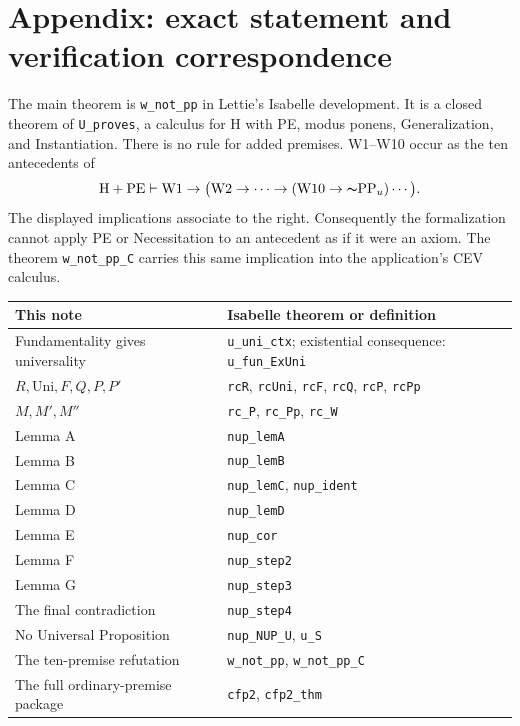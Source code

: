 \documentclass[12pt,leqno]{article}
\newcommand{\IC}{\ensuremath{\rightarrow}}
\newcommand{\NOT}{\ensuremath{\text{$\thicksim$}}}
\newcommand{\dentails}{\ensuremath{\vdash}}
\newcommand{\Uni}{\ensuremath{\mathrm{Uni}}}
\newcommand{\PPu}{\ensuremath{\mathrm{PP}_u}}
\newcommand{\HPE}{\ensuremath{\mathrm{H}+\mathrm{PE}}}
\theoremstyle{plain}
\begin{document}
\appendix
{}
\section*{Appendix: exact statement and verification correspondence}

The main theorem is \texttt{w\_not\_pp} in Lettie's Isabelle development.
It is a closed theorem of \texttt{U\_proves}, a calculus for H with PE,
modus ponens, Generalization, and Instantiation. There is no rule for
added premises. W1--W10 occur as the ten antecedents of
\[
 \HPE\dentails
 \mathrm{W1}\IC\bigl(\mathrm{W2}\IC\cdots
   \IC(\mathrm{W10}\IC\NOT\PPu)\cdots\bigr).
\]
The displayed implications associate to the right. Consequently the
formalization cannot apply PE or Necessitation to an antecedent as if it
were an axiom. The theorem \texttt{w\_not\_pp\_C} carries this same
implication into the application's CEV calculus.

\smallskip
\begin{singlespace}
{\small
\renewcommand{\arraystretch}{1.15}
\noindent
\begin{tabularx}{\textwidth}{@{}>{\raggedright\arraybackslash}p{}>{\raggedright\arraybackslash}X@{}}
\toprule
This note & Isabelle theorem or definition\\
\midrule
Fundamentality gives universality & \texttt{u\_uni\_ctx}; existential consequence:
  \texttt{u\_fun\_ExUni}\\
\(R,\Uni,F,Q,P,P'\) & \texttt{rcR}, \texttt{rcUni}, \texttt{rcF},
  \texttt{rcQ}, \texttt{rcP}, \texttt{rcPp}\\
\(M,M',M''\) & \texttt{rc\_P}, \texttt{rc\_Pp}, \texttt{rc\_W}\\
Lemma A & \texttt{nup\_lemA}\\
Lemma B & \texttt{nup\_lemB}\\
Lemma C & \texttt{nup\_lemC}, \texttt{nup\_ident}\\
Lemma D & \texttt{nup\_lemD}\\
Lemma E & \texttt{nup\_cor}\\
Lemma F & \texttt{nup\_step2}\\
Lemma G & \texttt{nup\_step3}\\
The final contradiction & \texttt{nup\_step4}\\
No Universal Proposition & \texttt{nup\_NUP\_U}, \texttt{u\_S}\\
The ten-premise refutation & \texttt{w\_not\_pp}, \texttt{w\_not\_pp\_C}\\
The full ordinary-premise package & \texttt{cfp2}, \texttt{cfp2\_thm}\\
\bottomrule
\end{tabularx}
\par
}
\end{singlespace}
\end{document}
